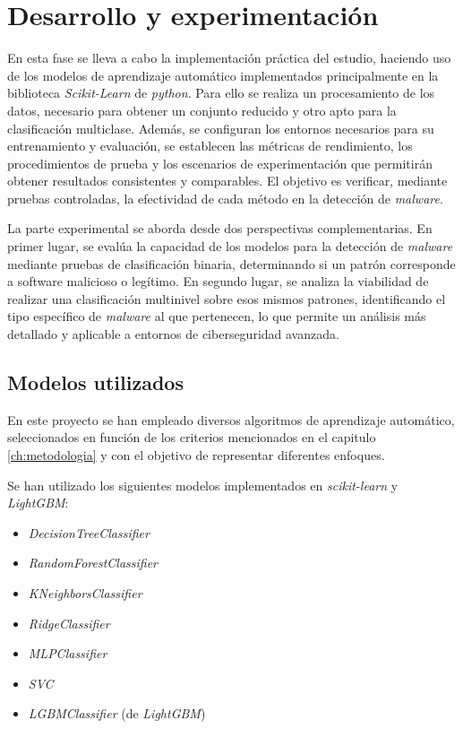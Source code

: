\chapter{Desarrollo y experimentación}
\label{ch:desarrollo}

En esta fase se lleva a cabo la implementación práctica del estudio, haciendo uso de los modelos de aprendizaje automático implementados principalmente en la biblioteca \textit{Scikit-Learn} de \textit{python}. Para ello se realiza un procesamiento de los datos, necesario para obtener un conjunto reducido y otro apto para la clasificación multiclase. Además, se configuran los entornos necesarios para su entrenamiento y evaluación, se establecen las métricas de rendimiento, los procedimientos de prueba y los escenarios de experimentación que permitirán obtener resultados consistentes y comparables. El objetivo es verificar, mediante pruebas controladas, la efectividad de cada método en la detección de \textit{malware}.

\vspace{1em}

La parte experimental se aborda desde dos perspectivas complementarias. En primer lugar, se evalúa la capacidad de los modelos para la detección de \textit{malware} mediante pruebas de clasificación binaria, determinando si un patrón corresponde a software malicioso o legítimo. En segundo lugar, se analiza la viabilidad de realizar una clasificación multinivel sobre esos mismos patrones, identificando el tipo específico de \textit{malware} al que pertenecen, lo que permite un análisis más detallado y aplicable a entornos de ciberseguridad avanzada.

\section{Modelos utilizados}
\label{sec:modelos_utilizados}

En este proyecto se han empleado diversos algoritmos de aprendizaje automático, seleccionados en función de los criterios mencionados en el capitulo \ref{ch:metodologia} y con el objetivo de representar diferentes enfoques.

Se han utilizado los siguientes modelos implementados en \textit{scikit-learn} y \textit{LightGBM}:

\begin{itemize}
	\item \textit{DecisionTreeClassifier}
	\item \textit{RandomForestClassifier}
	\item \textit{KNeighborsClassifier}
	\item \textit{RidgeClassifier}
	\item \textit{MLPClassifier}
	\item \textit{SVC}
	\item \textit{LGBMClassifier} (de \textit{LightGBM})
\end{itemize}

